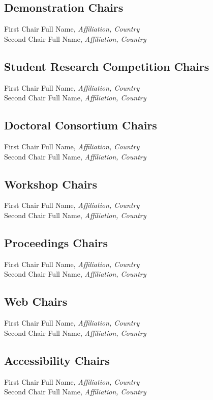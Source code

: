 \subsection{Demonstration Chairs}
First Chair Full Name, \emph{Affiliation, Country}\\
Second Chair Full Name, \emph{Affiliation, Country}\\

\subsection{Student Research Competition Chairs}
First Chair Full Name, \emph{Affiliation, Country}\\
Second Chair Full Name, \emph{Affiliation, Country}\\

\subsection{Doctoral Consortium Chairs}
First Chair Full Name, \emph{Affiliation, Country}\\
Second Chair Full Name, \emph{Affiliation, Country}\\

\subsection{Workshop Chairs}
First Chair Full Name, \emph{Affiliation, Country}\\
Second Chair Full Name, \emph{Affiliation, Country}\\

\subsection{Proceedings Chairs}
First Chair Full Name, \emph{Affiliation, Country}\\
Second Chair Full Name, \emph{Affiliation, Country}\\

\subsection{Web Chairs}
First Chair Full Name, \emph{Affiliation, Country}\\
Second Chair Full Name, \emph{Affiliation, Country}\\

\subsection{Accessibility Chairs}
First Chair Full Name, \emph{Affiliation, Country}\\
Second Chair Full Name, \emph{Affiliation, Country}\\

